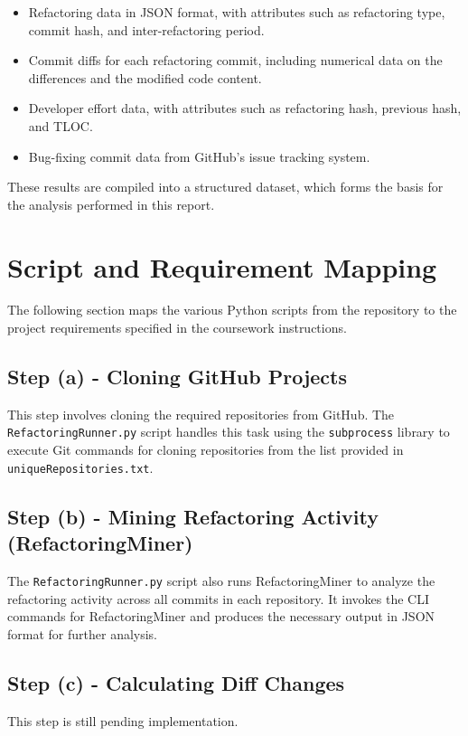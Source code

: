 \documentclass[sigconf]{acmart}
\begin{document}
\begin{itemize}
  \item Refactoring data in JSON format, with attributes such as refactoring type, commit hash, and inter-refactoring period.
  \item Commit diffs for each refactoring commit, including numerical data on the differences and the modified code content.
  \item Developer effort data, with attributes such as refactoring hash, previous hash, and TLOC.
  \item Bug-fixing commit data from GitHub's issue tracking system.
\end{itemize}

These results are compiled into a structured dataset, which forms the basis for the analysis performed in this report.


\section{Script and Requirement Mapping}
The following section maps the various Python scripts from the repository to the project requirements specified in the coursework instructions.

\subsection{Step (a) - Cloning GitHub Projects}
This step involves cloning the required repositories from GitHub. The \texttt{RefactoringRunner.py} script handles this task using the \texttt{subprocess} library to execute Git commands for cloning repositories from the list provided in \texttt{uniqueRepositories.txt}.

\subsection{Step (b) - Mining Refactoring Activity (RefactoringMiner)}
The \texttt{RefactoringRunner.py} script also runs RefactoringMiner to analyze the refactoring activity across all commits in each repository. It invokes the CLI commands for RefactoringMiner and produces the necessary output in JSON format for further analysis.

\subsection{Step (c) - Calculating Diff Changes}
This step is still pending implementation.
\end{document}
